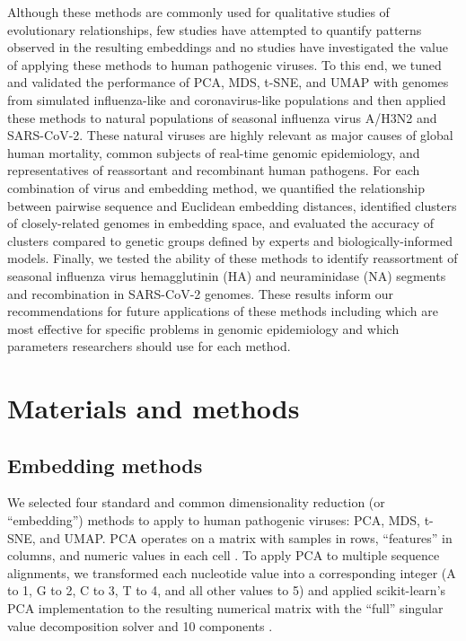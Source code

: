 \documentclass[10pt,letterpaper]{article}
\begin{document}
Although these methods are commonly used for qualitative studies of evolutionary relationships, few studies have attempted to quantify patterns observed in the resulting embeddings and no studies have investigated the value of applying these methods to human pathogenic viruses.
To this end, we tuned and validated the performance of PCA, MDS, t-SNE, and UMAP with genomes from simulated influenza-like and coronavirus-like populations and then applied these methods to natural populations of seasonal influenza virus A/H3N2 and SARS-CoV-2.
These natural viruses are highly relevant as major causes of global human mortality, common subjects of real-time genomic epidemiology, and representatives of reassortant and recombinant human pathogens.
For each combination of virus and embedding method, we quantified the relationship between pairwise sequence and Euclidean embedding distances, identified clusters of closely-related genomes in embedding space, and evaluated the accuracy of clusters compared to genetic groups defined by experts and biologically-informed models.
Finally, we tested the ability of these methods to identify reassortment of seasonal influenza virus hemagglutinin (HA) and neuraminidase (NA) segments and recombination in SARS-CoV-2 genomes.
These results inform our recommendations for future applications of these methods including which are most effective for specific problems in genomic epidemiology and which parameters researchers should use for each method.

\section*{Materials and methods}

\subsection*{Embedding methods}

We selected four standard and common dimensionality reduction (or ``embedding'') methods to apply to human pathogenic viruses: PCA, MDS, t-SNE, and UMAP.
PCA operates on a matrix with samples in rows, ``features'' in columns, and numeric values in each cell \cite{jolliffe_cadima_2016}.
To apply PCA to multiple sequence alignments, we transformed each nucleotide value into a corresponding integer (A to 1, G to 2, C to 3, T to 4, and all other values to 5) and applied scikit-learn's PCA implementation to the resulting numerical matrix with the ``full'' singular value decomposition solver and 10 components \cite{Pedregosa2011}.
\end{document}
